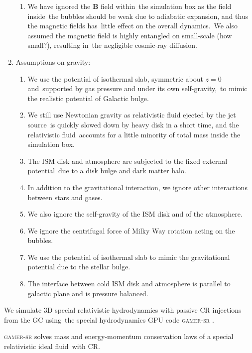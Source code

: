 \documentclass[twocolumn]{aastex631}
\begin{document}
\begin{enumerate}
\begin{enumerate}
      \item We have ignored the $\mathbf{B}$ field within\
            the simulation box as the field inside\
            the bubbles should be weak due to adiabatic expansion, and thus the magnetic fields has\
            little effect on the overall dynamics.\
            We also assumed the magnetic field is highly entangled on small-scale (how small?), resulting in\
            the negligible cosmic-ray diffusion.
    \end{enumerate}
  \item Assumptions on gravity:
    \begin{enumerate}
      \item We use the potential of isothermal slab, symmetric about $z=0$ and\
            supported by gas pressure and under its own self-gravity,\
            to mimic the realistic potential of Galactic bulge.
      \item We still use Newtonian gravity as relativistic fluid ejected by the jet source\
            is quickly slowed down by heavy disk in a short time, and the relativistic fluid\
            accounts for a little minority of total mass inside the simulation box.
      \item The ISM disk and atmosphere are subjected to the fixed external potential\
            due to a disk bulge and dark matter halo.
      \item In addition to the gravitational interaction, we ignore other interactions between stars and gases.
      \item We also ignore the self-gravity of the ISM disk and of the atmosphere.
      \item We ignore the centrifugal force of Milky Way rotation acting on the bubbles.
      \item We use the potential of isothermal slab to mimic the gravitational potential due to the stellar bulge.
      \item The interface between cold ISM disk and atmosphere is parallel to galactic plane and is pressure balanced.
    \end{enumerate}
\end{enumerate}
We simulate 3D special relativistic hydrodynamics with passive CR injections from the GC using\
the special hydrodynamics GPU code \textsc{gamer-sr} \citep{tseng2021}.

\textsc{gamer-sr} solves mass and energy-momentum conservation laws of a special relativistic ideal fluid\
with CR.
\end{document}
